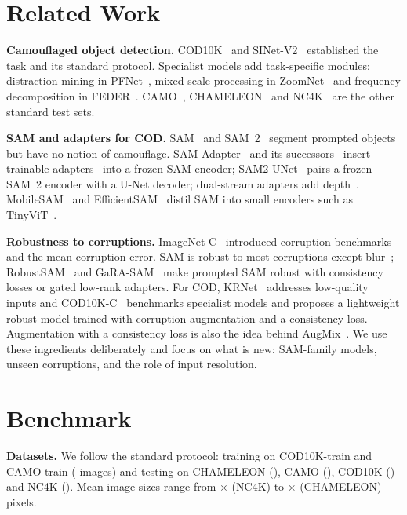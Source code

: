 \documentclass[conference]{IEEEtran}
\begin{document}
\section{Related Work}
\textbf{Camouflaged object detection.} COD10K~\cite{fan2020cod} and SINet-V2~\cite{fan2022sinetv2} established the task and its standard protocol. Specialist models add task-specific modules: distraction mining in PFNet~\cite{mei2021pfnet}, mixed-scale processing in ZoomNet~\cite{pang2022zoomnet} and frequency decomposition in FEDER~\cite{he2023feder}. CAMO~\cite{le2019camo}, CHAMELEON~\cite{skurowski2018chameleon} and NC4K~\cite{lv2021nc4k} are the other standard test sets.

\textbf{SAM and adapters for COD.} SAM~\cite{kirillov2023sam} and SAM~2~\cite{ravi2024sam2} segment prompted objects but have no notion of camouflage. SAM-Adapter~\cite{chen2023samadapter} and its successors~\cite{chen2024sam2adapter,chen2025sam3adapter} insert trainable adapters~\cite{houlsby2019adapters,chen2022adaptformer} into a frozen SAM encoder; SAM2-UNet~\cite{xiong2024sam2unet} pairs a frozen SAM~2 encoder with a U-Net decoder; dual-stream adapters add depth~\cite{liu2025samdsa}. MobileSAM~\cite{zhang2023mobilesam} and EfficientSAM~\cite{xiong2024efficientsam} distil SAM into small encoders such as TinyViT~\cite{wu2022tinyvit}.

\textbf{Robustness to corruptions.} ImageNet-C~\cite{hendrycks2019imagenetc} introduced corruption benchmarks and the mean corruption error. SAM is robust to most corruptions except blur~\cite{huang2023robustsam_eval,qiao2023samcorruptions}; RobustSAM~\cite{chen2024robustsam} and GaRA-SAM~\cite{gara2025} make prompted SAM robust with consistency losses or gated low-rank adapters. For COD, KRNet~\cite{guan2025krnet} addresses low-quality inputs and COD10K-C~\cite{sayem2026cod10kc} benchmarks specialist models and proposes a lightweight robust model trained with corruption augmentation and a consistency loss. Augmentation with a consistency loss is also the idea behind AugMix~\cite{hendrycks2020augmix}. We use these ingredients deliberately and focus on what is new: SAM-family models, unseen corruptions, and the role of input resolution.

\section{Benchmark}
\textbf{Datasets.} We follow the standard protocol: training on COD10K-train and CAMO-train (\NImagesTrain{} images) and testing on CHAMELEON (\NImagesCham), CAMO (\NImagesCamo), COD10K (\NImagesCod) and NC4K (\NImagesNck). Mean image sizes range from \NSizeNckH$\times$\NSizeNckW{} (NC4K) to \NSizeChamH$\times$\NSizeChamW{} (CHAMELEON) pixels.
\end{document}
